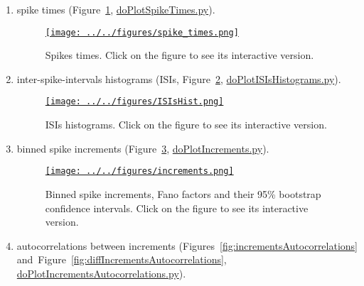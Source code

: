 \documentclass[10pt]{article}
\begin{document}
\begin{enumerate}

    \item spike times (Figure~\ref{fig:spikesTimes},
\href{https://github.com/joacorapela/singleNeuronSpikesAnalysisTutorial/blob/master/code/scripts/doPlotSpikeTimes.py}{doPlotSpikeTimes.py}).

\begin{figure}
    \href{http://www.gatsby.ucl.ac.uk/~rapela/singleNeuronSpikesAnalysisTutorial/figures/spike_times.html}{\texttt{[image: ../../figures/spike\_times.png]}}
    \caption{Spikes times. Click on the figure to see its interactive version.}
    \label{fig:spikesTimes}
\end{figure}

    \item inter-spike-intervals histograms (ISIs, Figure~\ref{fig:ISIsHist},
\href{https://github.com/joacorapela/singleNeuronSpikesAnalysisTutorial/blob/master/code/scripts/doPlotISIsHistograms.py}{doPlotISIsHistograms.py}). 

\begin{figure}
    \href{http://www.gatsby.ucl.ac.uk/~rapela/singleNeuronSpikesAnalysisTutorial/figures/ISIsHist.html}{\texttt{[image: ../../figures/ISIsHist.png]}}
    \caption{ISIs histograms. Click on the figure to see its interactive version.}
    \label{fig:ISIsHist}
\end{figure}

    \item binned spike increments (Figure~\ref{fig:increments},
\href{https://github.com/joacorapela/singleNeuronSpikesAnalysisTutorial/blob/master/code/scripts/doPlotIncrements.py}{doPlotIncrements.py}).

\begin{figure}
    \href{http://www.gatsby.ucl.ac.uk/~rapela/singleNeuronSpikesAnalysisTutorial/figures/increments.html}{\texttt{[image: ../../figures/increments.png]}}
    \caption{Binned spike increments, Fano factors and their 95\% bootstrap confidence intervals. Click on the figure to see its interactive version.}
    \label{fig:increments}
\end{figure}

    \item autocorrelations between increments (Figures~\ref{fig:incrementsAutocorrelations} and~Figure~\ref{fig:diffIncrementsAutocorrelations}, \href{https://github.com/joacorapela/singleNeuronSpikesAnalysisTutorial/blob/master/code/scripts/doPlotIncrementsAutocorrelations.py}{doPlotIncrementsAutocorrelations.py}).


\end{enumerate}
\end{document}
